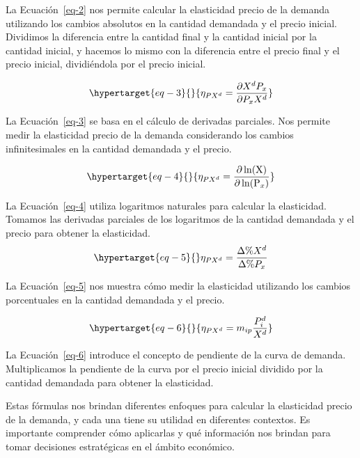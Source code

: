 \documentclass[
  a4paper,
]{article}
\begin{document}
La Ecuación~\ref{eq-2} nos permite calcular la elasticidad precio de la
demanda utilizando los cambios absolutos en la cantidad demandada y el
precio inicial. Dividimos la diferencia entre la cantidad final y la
cantidad inicial por la cantidad inicial, y hacemos lo mismo con la
diferencia entre el precio final y el precio inicial, dividiéndola por
el precio inicial.

\begin{equation}\protect\hypertarget{eq-3}{}{
\eta _{PX^d} = \frac{\partial X^d P_x}{\partial P_x X^d}
}\label{eq-3}\end{equation}

La Ecuación~\ref{eq-3} se basa en el cálculo de derivadas parciales. Nos
permite medir la elasticidad precio de la demanda considerando los
cambios infinitesimales en la cantidad demandada y el precio.

\begin{equation}\protect\hypertarget{eq-4}{}{
\eta _{PX^d} = \frac{\partial \ln(\mathrm X)}{\partial  \ln(\mathrm P_x)}
}\label{eq-4}\end{equation}

La Ecuación~\ref{eq-4} utiliza logaritmos naturales para calcular la
elasticidad. Tomamos las derivadas parciales de los logaritmos de la
cantidad demandada y el precio para obtener la elasticidad.
\begin{equation}\protect\hypertarget{eq-5}{}{
\eta _{PX^d} = \frac{\Delta \% X^d}{\Delta \% P_x}
}\label{eq-5}\end{equation}

La Ecuación~\ref{eq-5} nos muestra cómo medir la elasticidad utilizando
los cambios porcentuales en la cantidad demandada y el precio.

\begin{equation}\protect\hypertarget{eq-6}{}{
\eta_{PX^d} = m_{ip} \frac{P_i^d}{X^d}
}\label{eq-6}\end{equation}

La Ecuación~\ref{eq-6} introduce el concepto de pendiente de la curva de
demanda. Multiplicamos la pendiente de la curva por el precio inicial
dividido por la cantidad demandada para obtener la elasticidad.

Estas fórmulas nos brindan diferentes enfoques para calcular la
elasticidad precio de la demanda, y cada una tiene su utilidad en
diferentes contextos. Es importante comprender cómo aplicarlas y qué
información nos brindan para tomar decisiones estratégicas en el ámbito
económico.
\end{document}
